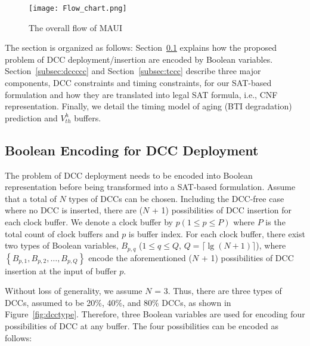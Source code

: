 \begin{figure}
	\centering
	\texttt{[image: Flow\_chart.png]}
	\caption{The overall flow of MAUI}
	\label{fig:flow}
\end{figure}
 

The section is organized as follows: Section~\ref{subsec:eddcd} explains how the proposed problem of DCC deployment/insertion are encoded by Boolean variables. Section~\ref{subsec:dccccc} and Section~\ref{subsec:tccc} describe three major components, DCC constraints and timing constraints, for our SAT-based formulation and how they are translated into legal SAT formula, i.e., CNF representation. Finally, we detail the timing model of aging (BTI degradation) prediction and $V_{th}^h$ buffers.


\subsection{Boolean Encoding for DCC Deployment}
\label{subsec:eddcd}
The problem of DCC deployment needs to be encoded into Boolean representation before being transformed into a SAT-based formulation. Assume that a total of $N$ types of DCCs can be chosen. Including the DCC-free case where no DCC is inserted, there are ($N$ + 1) possibilities of DCC insertion for each clock buffer. We denote a clock buffer by $p\left(1 \leq p \leq P\right)$ where $P$ is the total count of clock buffers and $p$ is buffer index. For each clock buffer, there exist two types of Boolean variables, {\fontsize{9}{10}$B_{p,q}$} ($1 \leq q \leq Q $, $Q = \lceil \lg (N + 1)\rceil$), where {\fontsize{9}{10}$\left\{B_{p,1}, B_{p,2},\dotsc, B_{p,Q}\right\}$} encode the aforementioned ($N$ + 1) possibilities of DCC insertion at the input of buffer $p$.



Without loss of generality, we assume $N$ = 3. Thus, there are three types of DCCs, assumed to be 20\%, 40\%, and 80\% DCCs, as shown in Figure~\ref{fig:dcctype}. Therefore, three Boolean variables are used for encoding four possibilities of DCC at any buffer. The four possibilities can be encoded as follows:

